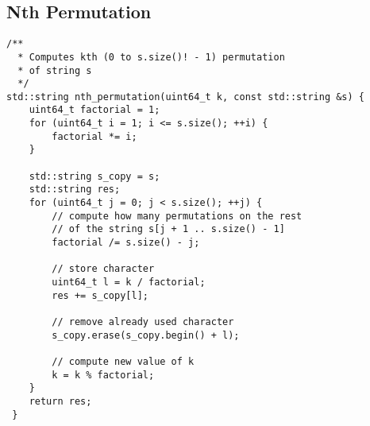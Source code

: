 \subsection{Nth Permutation}
\begin{verbatim}
/**
  * Computes kth (0 to s.size()! - 1) permutation
  * of string s
  */
std::string nth_permutation(uint64_t k, const std::string &s) {
    uint64_t factorial = 1;
    for (uint64_t i = 1; i <= s.size(); ++i) {
        factorial *= i;
    }

    std::string s_copy = s;
    std::string res;
    for (uint64_t j = 0; j < s.size(); ++j) {
        // compute how many permutations on the rest
        // of the string s[j + 1 .. s.size() - 1]
        factorial /= s.size() - j;

        // store character 
        uint64_t l = k / factorial;
        res += s_copy[l];

        // remove already used character
        s_copy.erase(s_copy.begin() + l);

        // compute new value of k
        k = k % factorial;
    }
    return res;
 }
\end{verbatim}
